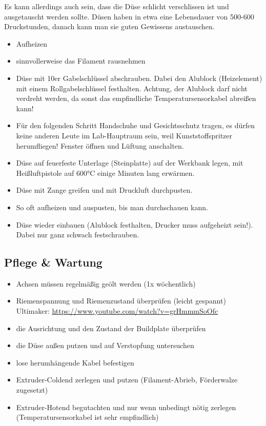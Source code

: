 \documentclass{\basedir/fablab-document}
\begin{document}
Es kann allerdings auch sein, dass die Düse schlicht verschlissen ist und ausgetauscht werden sollte. Düsen haben in etwa eine Lebensdauer von 500-600 Druckstunden, danach kann man sie guten Gewissens austauschen.

\begin{itemize}
 \item Aufheizen
 \item sinnvollerweise das Filament rausnehmen
 \item Düse mit 10er Gabelschlüssel abschrauben. Dabei den Alublock (Heizelement) mit einem Rollgabelschlüssel festhalten. Achtung, der Alublock darf nicht verdreht werden, da sonst das empfindliche Temperatursensorkabel abreißen kann!
 \item Für den folgenden Schritt Handschuhe und Gesichtsschutz tragen, es dürfen keine anderen Leute im Lab-Hauptraum sein, weil Kunststoffspritzer herumfliegen! Fenster öffnen und Lüftung anschalten.
 \item Düse auf feuerfeste Unterlage (Steinplatte) auf der Werkbank legen, mit Heißluftpistole auf 600°C einige Minuten lang erwärmen.
 \item Düse mit Zange greifen und mit Druckluft durchpusten.
 \item So oft aufheizen und auspusten, bis man durchschauen kann.
 \item Düse wieder einbauen (Alublock festhalten, Drucker muss aufgeheizt sein!). Dabei nur ganz schwach festschrauben.
\end{itemize}


\subsection{Pflege \& Wartung}

\begin{itemize}
\item Achsen müssen regelmäßig geölt werden (1x wöchentlich)
\item Riemenspannung und Riemenzustand überprüfen (leicht gespannt)\\
Ultimaker: \url{https://www.youtube.com/watch?v=grHmmmSoOfc}
\item die Ausrichtung und den Zustand der Buildplate überprüfen
\item die Düse außen putzen und auf Verstopfung untersuchen
\item lose herumhängende Kabel befestigen
\item Extruder-Coldend zerlegen und putzen (Filament-Abrieb, Förderwalze zugesetzt)
\item Extruder-Hotend begutachten und nur wenn unbedingt nötig zerlegen (Temperatursensorkabel ist sehr empfindlich)
\end{itemize}
\end{document}
